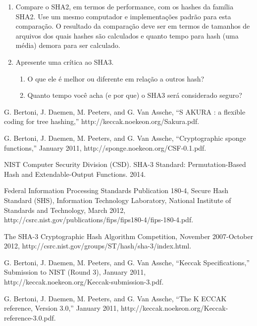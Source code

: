 \documentclass[12pt, a4paper]{article}
\begin{document}
\begin{enumerate}
\begin{enumerate}
\end{enumerate}

\item Compare o SHA2, em termos de performance, com os hashes da família SHA2.
Use um mesmo computador e implementações padrão para esta comparação. O
resultado da comparação deve ser em termos de tamanhos de arquivos dos quais
hashes são calculados e quanto tempo para hash (uma média) demora para ser
calculado.\\

\item Apresente uma crítica ao SHA3.\\

\begin{enumerate}

\item O que ele é melhor ou diferente em relação a outros hash?\\

\item Quanto tempo você acha (e por que) o SHA3 será considerado
seguro?\\

\end{enumerate}

\end{enumerate}

\pagebreak
\begin{thebibliography}{9}
 G. Bertoni, J. Daemen, M. Peeters, and G. Van Assche, “S AKURA
: a flexible coding for tree hashing,” http://keccak.noekeon.org/Sakura.pdf.

 G. Bertoni, J. Daemen, M. Peeters, and G. Van Assche,
“Cryptographic sponge functions,” January 2011,
http://sponge.noekeon.org/CSF-0.1.pdf.

 NIST Computer Security Division (CSD). SHA-3 Standard:
Permutation-Based Hash and Extendable-Output Functions. 2014.

 Federal Information Processing Standards Publication 180-4,
Secure Hash Standard (SHS), Information Technology Laboratory, National
Institute of Standards and Technology, March 2012,
http://csrc.nist.gov/publications/fips/fips180-4/fips-180-4.pdf.

 The SHA-3 Cryptographic Hash Algorithm Competition, November
2007-October 2012, http://csrc.nist.gov/groups/ST/hash/sha-3/index.html.

 G. Bertoni, J. Daemen, M. Peeters, and G. Van Assche, “Keccak
Specifications,” Submission to NIST (Round 3), January 2011,
http://keccak.noekeon.org/Keccak-submission-3.pdf.

 G. Bertoni, J. Daemen, M. Peeters, and G. Van Assche, “The K
ECCAK reference, Version 3.0,” January 2011,
http://keccak.noekeon.org/Keccak-reference-3.0.pdf.
\end{thebibliography}

\smallskip
\end{document}
